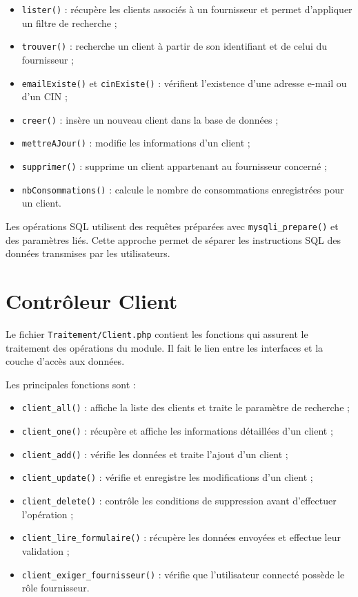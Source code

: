 \begin{itemize}[leftmargin=*]
    \item \texttt{lister()} : récupère les clients associés à un fournisseur et permet d'appliquer un filtre de recherche ;
    \item \texttt{trouver()} : recherche un client à partir de son identifiant et de celui du fournisseur ;
    \item \texttt{emailExiste()} et \texttt{cinExiste()} : vérifient l'existence d'une adresse e-mail ou d'un CIN ;
    \item \texttt{creer()} : insère un nouveau client dans la base de données ;
    \item \texttt{mettreAJour()} : modifie les informations d'un client ;
    \item \texttt{supprimer()} : supprime un client appartenant au fournisseur concerné ;
    \item \texttt{nbConsommations()} : calcule le nombre de consommations enregistrées pour un client.
\end{itemize}

Les opérations SQL utilisent des requêtes préparées avec \texttt{mysqli\_prepare()} et des paramètres liés. Cette approche permet de séparer les instructions SQL des données transmises par les utilisateurs.

\section{Contrôleur Client}

Le fichier \texttt{Traitement/Client.php} contient les fonctions qui assurent le traitement des opérations du module. Il fait le lien entre les interfaces et la couche d'accès aux données.

Les principales fonctions sont :

\begin{itemize}[leftmargin=*]
    \item \texttt{client\_all()} : affiche la liste des clients et traite le paramètre de recherche ;
    \item \texttt{client\_one()} : récupère et affiche les informations détaillées d'un client ;
    \item \texttt{client\_add()} : vérifie les données et traite l'ajout d'un client ;
    \item \texttt{client\_update()} : vérifie et enregistre les modifications d'un client ;
    \item \texttt{client\_delete()} : contrôle les conditions de suppression avant d'effectuer l'opération ;
    \item \texttt{client\_lire\_formulaire()} : récupère les données envoyées et effectue leur validation ;
    \item \texttt{client\_exiger\_fournisseur()} : vérifie que l'utilisateur connecté possède le rôle fournisseur.
\end{itemize}

